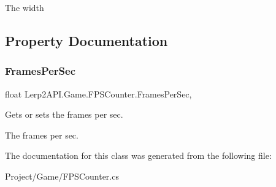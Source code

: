 The width 



\subsection{Property Documentation}
\mbox{\label{class_lerp2_a_p_i_1_1_game_1_1_f_p_s_counter_ac04fcbbbae098f3edcf98aa3ab035406}} 
\subsubsection{\texorpdfstring{Frames\+Per\+Sec}{FramesPerSec}}
{\footnotesize\ttfamily float Lerp2\+A\+P\+I.\+Game.\+F\+P\+S\+Counter.\+Frames\+Per\+Sec\hspace{0.3cm}{\ttfamily [get]}, {}}



Gets or sets the frames per sec. 

The frames per sec.

The documentation for this class was generated from the following file\+:\begin{DoxyCompactItemize}
\item 
Project/\+Game/F\+P\+S\+Counter.\+cs\end{DoxyCompactItemize}
